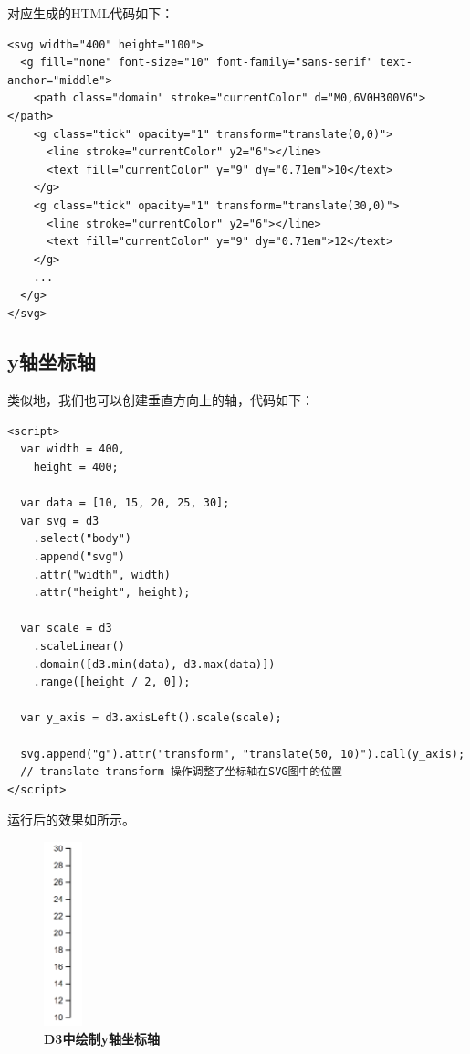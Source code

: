 对应生成的HTML代码如下：

\begin{verbatim}
<svg width="400" height="100">
  <g fill="none" font-size="10" font-family="sans-serif" text-anchor="middle">
    <path class="domain" stroke="currentColor" d="M0,6V0H300V6"></path>
    <g class="tick" opacity="1" transform="translate(0,0)">
      <line stroke="currentColor" y2="6"></line>
      <text fill="currentColor" y="9" dy="0.71em">10</text>
    </g>
    <g class="tick" opacity="1" transform="translate(30,0)">
      <line stroke="currentColor" y2="6"></line>
      <text fill="currentColor" y="9" dy="0.71em">12</text>
    </g>
    ...
  </g>
</svg>
\end{verbatim}

\subsection{y轴坐标轴}

类似地，我们也可以创建垂直方向上的轴，代码如下：

\begin{verbatim}
<script>
  var width = 400,
    height = 400;

  var data = [10, 15, 20, 25, 30];
  var svg = d3
    .select("body")
    .append("svg")
    .attr("width", width)
    .attr("height", height);

  var scale = d3
    .scaleLinear()
    .domain([d3.min(data), d3.max(data)])
    .range([height / 2, 0]);

  var y_axis = d3.axisLeft().scale(scale);

  svg.append("g").attr("transform", "translate(50, 10)").call(y_axis);
  // translate transform 操作调整了坐标轴在SVG图中的位置
</script>
\end{verbatim}

运行后的效果如所示。

\begin{figure}[htbp]
    \centering
    \includegraphics[width=0.1\textwidth]{figure/D3/axis_y.png}
    \caption{\textbf{D3中绘制y轴坐标轴}}
    \label{fig:axis_y}
\end{figure}

